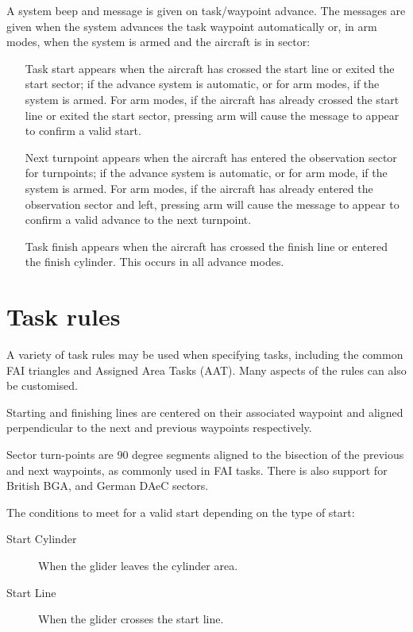 \documentclass[a4paper,12pt]{refrep}
\begin{document}
A system beep and message is given on task/waypoint advance.  The
messages are given when the system advances the task waypoint
automatically or, in arm modes, when the system is armed and the
aircraft is in sector:
\begin{itemize}
\item[Task start] appears when the aircraft has crossed the start line or
 exited the start sector; if the advance system is automatic, or for
 arm modes, if the system is armed.  For arm modes, if the aircraft
 has already crossed the start line or exited the start sector,
 pressing arm will cause the message to appear to confirm a valid
 start.
\item[Next turnpoint] appears when the aircraft has entered the observation
 sector for turnpoints; if the advance system is automatic, or for arm
 mode, if the system is armed.  For arm modes, if the aircraft has
 already entered the observation sector and left, pressing arm will
 cause the message to appear to confirm a valid advance to the next
 turnpoint.
\item[Task finish] appears when the aircraft has crossed the finish line
 or entered the finish cylinder.  This occurs in all advance modes. 
\end{itemize}

\section{Task rules}\label{sec:task-rules}

A variety of task rules may be used when specifying tasks, including
the common FAI triangles and Assigned Area Tasks (AAT).  Many aspects
of the rules can also be customised.

Starting and finishing lines are centered on their associated waypoint
and aligned perpendicular to the next and previous waypoints
respectively.

Sector turn-points are 90 degree segments aligned to the bisection of
the previous and next waypoints, as commonly used in FAI tasks.
There is also support for British BGA, and German DAeC sectors.

The conditions to meet for a valid start depending on the type of start:
\begin{description}
\item[Start Cylinder] When the glider leaves the cylinder area.
\item[Start Line] When the glider crosses the start line.
\end{description}
\end{document}
